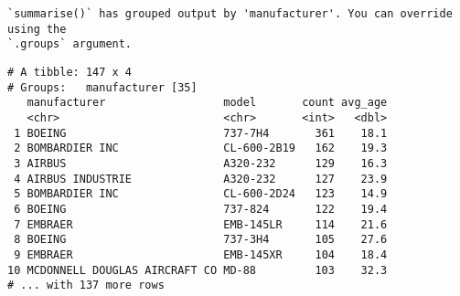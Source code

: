 \documentclass[
  letterpaper,
  DIV=11,
  numbers=noendperiod]{scrreprt}
\begin{document}
\begin{verbatim}
`summarise()` has grouped output by 'manufacturer'. You can override using the
`.groups` argument.
\end{verbatim}

\begin{verbatim}
# A tibble: 147 x 4
# Groups:   manufacturer [35]
   manufacturer                  model       count avg_age
   <chr>                         <chr>       <int>   <dbl>
 1 BOEING                        737-7H4       361    18.1
 2 BOMBARDIER INC                CL-600-2B19   162    19.3
 3 AIRBUS                        A320-232      129    16.3
 4 AIRBUS INDUSTRIE              A320-232      127    23.9
 5 BOMBARDIER INC                CL-600-2D24   123    14.9
 6 BOEING                        737-824       122    19.4
 7 EMBRAER                       EMB-145LR     114    21.6
 8 BOEING                        737-3H4       105    27.6
 9 EMBRAER                       EMB-145XR     104    18.4
10 MCDONNELL DOUGLAS AIRCRAFT CO MD-88         103    32.3
# ... with 137 more rows
\end{verbatim}
\end{document}
